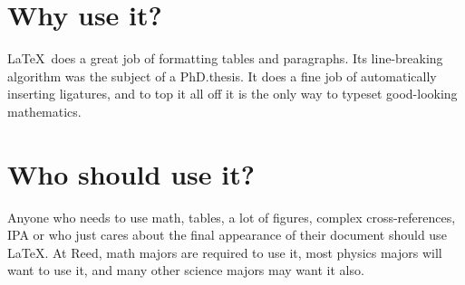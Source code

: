 \section{Why use it?}
	
\LaTeX\ does a great job of formatting tables and paragraphs. Its line-breaking algorithm was the subject of a PhD.\thinspace thesis. It does a fine job of automatically inserting ligatures, and to top it all off it is the only way to typeset good-looking mathematics.

\section{Who should use it?}

Anyone who needs to use math, tables, a lot of figures, complex cross-references, IPA or who just cares about the final appearance of their document should use \LaTeX. At Reed, math majors are required to use it, most physics majors will want to use it, and many other science majors may want it also.